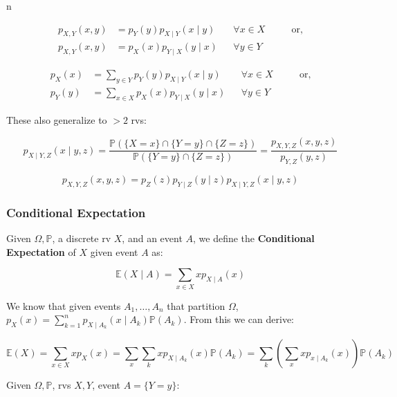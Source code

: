 n\documentclass{article}
\begin{document}
\begin{equation}
  \tag{Product Rule of Sorts}
  \boxed{
    \begin{aligned}
      p_{X,Y}(x,y)
      &= p_Y(y) p_{X\mid Y}(x\mid y)
      && \forall x \in X
      &&& \text{ or,} \\
      p_{X,Y}(x,y)
      &= p_X(x) p_{Y\mid X}(y\mid x)
      && \forall y \in Y
    \end{aligned}
  }
\end{equation}

\begin{equation}
  \tag{Total-Prob Rule of Sorts}
  \boxed{
    \begin{aligned}
      p_X(x)
      &= \sum_{y \in Y} p_Y(y) p_{X\mid Y}(x \mid y)
      && \forall x \in X
      &&& \text{ or,} \\
      p_Y(y)
      &= \sum_{x \in X} p_X(x) p_{Y \mid X} (y\mid x)
      && \forall y \in Y
    \end{aligned}
  }
\end{equation}

These also generalize to $> 2$ rvs:

\[
  p_{X\mid Y,Z}(x\mid y,z) = \frac{\mathbb{P}(\{X=x\} \cap \{Y=y\}
    \cap \{Z = z\})} {\mathbb{P}(\{Y=y\} \cap \{Z=z\})} =
  \frac{p_{X,Y,Z} (x,y,z)} {p_{Y,Z}(y,z)}
\]

\[
  p_{X,Y,Z}(x,y,z) = p_Z(z) p_{Y \mid Z}(y\mid z) p_{X\mid Y,Z} (x
  \mid y,z)
\]

\subsubsection{Conditional Expectation}

Given $\Omega, \mathbb{P}$, a discrete rv $X$, and an event $A$, we
define the \textbf{Conditional Expectation} of $X$ given event $A$ as:

\begin{equation}
  \tag{Conditional Expectation}
  \boxed{
    \mathbb{E}(X \mid A) = \sum_{x\in X} xp_{X\mid A}(x)
  }
\end{equation}

We know that given events $A_1, \dots, A_n$ that partition $\Omega$,
$p_X(x) = \sum_{k=1}^n p_{X\mid A_k} (x\mid A_k)
\mathbb{P}(A_k)$. From this we can derive:

\[
  \mathbb{E}(X) = \sum_{x\in X} xp_X(x) = \sum_x \sum_k xp_{X\mid A_k}
  (x) \mathbb{P}(A_k) = \sum_k(\sum_x xp_{x\mid A_k}(x))
  \mathbb{P}(A_k)
\]

Given $\Omega, \mathbb{P}$, rvs $X,Y$, event $A = \{Y=y\}$:
\end{document}
